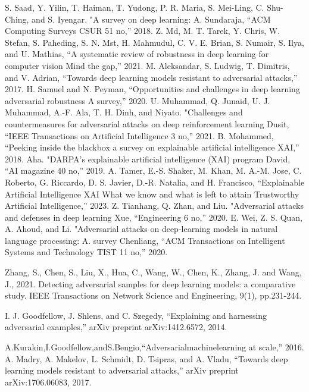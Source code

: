 \documentclass[10pt, conference, a4paper, final]{IEEEtran}
\begin{document}
\begin{thebibliography}{01}

    S. Saad, Y. Yilin, T. Haiman, T. Yudong, P. R. Maria, S. Mei-Ling, C. Shu-Ching, and S. Iyengar. "A survey on deep learning: A. Sundaraja, “ACM Computing Surveys CSUR 51 no,” 2018.
     Z. Md, M. T. Tarek, Y. Chris, W. Stefan, S. Paheding, S. N. Mst, H. Mahmudul, C. V. E. Brian, 
    S. Numair, S. Ilya, and U. Mathias, “A systematic review of robustness in deep learning for computer vision Mind the gap,” 2021.
    M. Aleksandar, S. Ludwig, T. Dimitris, and V. Adrian, “Towards deep learning models resistant to adversarial attacks,” 2017.
    H. Samuel and N. Peyman, “Opportunities and challenges in deep learning adversarial robustness A survey,” 2020.
    U. Muhammad, Q. Junaid, U. J. Muhammad, A.-F. Ala, T. H. Dinh, and Niyato. "Challenges and countermeasures for adversarial attacks on deep reinforcement learning Dusit, “IEEE Transactions on Artificial Intelligence 3 no,” 2021.
    B. Mohammed, “Peeking inside the blackbox a survey on explainable artificial intelligence XAI,” 2018.
    Aha. "DARPA’s explainable artificial intelligence (XAI) program David, “AI magazine 40 no,” 2019.
    A. Tamer, E.-S. Shaker, M. Khan, M. A.-M. Jose, C. Roberto, G. Riccardo, D. S. Javier, D.-R. Natalia, and H. Francisco, “Explainable Artificial Intelligence XAI What we know and what is left to attain Trustworthy Artificial Intelligence,” 2023.
    Z. Tianhang, Q. Zhan, and Liu. "Adversarial attacks and defenses in deep learning Xue, “Engineering 6 no,” 2020.
    E. Wei, Z. S. Quan, A. Ahoud, and Li. "Adversarial attacks on deep-learning models in natural language processing: A. survey Chenliang, “ACM Transactions on Intelligent Systems and Technology TIST 11 no,” 2020.

    Zhang, S., Chen, S., Liu, X., Hua, C., Wang, W., Chen, K., Zhang, J. and Wang, J., 2021. Detecting adversarial samples for deep learning models: a comparative study. IEEE Transactions on Network Science and Engineering, 9(1), pp.231-244.

    I. J. Goodfellow, J. Shlens, and C. Szegedy, “Explaining and harnessing
    adversarial examples,” arXiv preprint arXiv:1412.6572, 2014.

    A.Kurakin,I.Goodfellow,andS.Bengio,“Adversarialmachinelearning at scale,” 2016.
    A. Madry, A. Makelov, L. Schmidt, D. Tsipras, and A. Vladu, “Towards deep learning models resistant to adversarial attacks,” arXiv preprint arXiv:1706.06083, 2017. 


\end{thebibliography}
\end{document}
